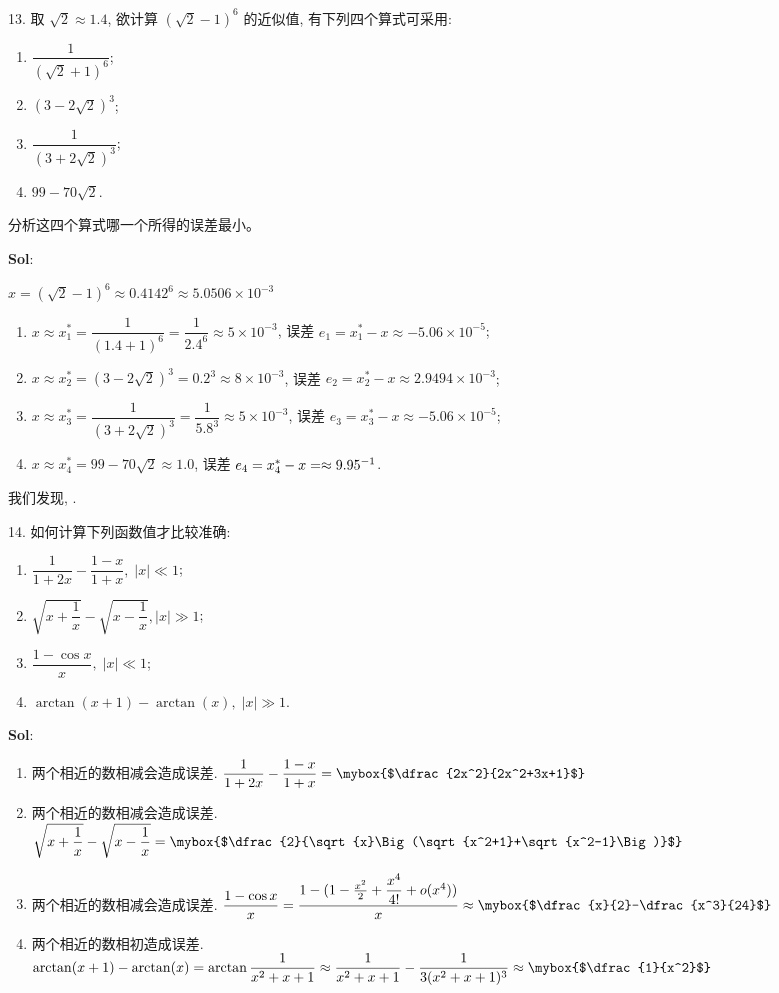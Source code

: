 
13. 取 $\sqrt{2}\approx  1.4$, 欲计算 $(\sqrt{2}-1)^6$ 的近似值, 有下列四个算式可采用:
\begin{enumerate}[(1)]
    \item $\dfrac{1}{(\sqrt{2}+1)^6}$;
    \item $(3-2\sqrt{2})^3$;
    \item $\dfrac{1}{(3+2\sqrt{2})^3}$;
    \item $99-70\sqrt{2}$.
\end{enumerate}
分析这四个算式哪一个所得的误差最小。

\textbf{Sol}:

$x=(\sqrt{2}-1)^6\approx 0.4142^6\approx5.0506\times 10^{-3}$
\begin{enumerate}
    \item $x\approx x_1^*=\dfrac{1}{(1.4+1)^6}=\dfrac{1}{2.4^6}\approx5\times 10^{-3}$, 误差 $e_1=x_1^*-x\approx -5.06\times 10^{-5}$;
    \item $x\approx x_2^*=(3-2\sqrt{2})^3=0.2^3\approx8\times10^{-3}$, 误差 $e_2=x_2^*-x\approx 2.9494\times 10^{-3}$;
    \item $x\approx x_3^*=\dfrac{1}{(3+2\sqrt{2})^3}=\dfrac{1}{5.8^3}\approx 5\times 10^{-3}$, 误差 $e_3=x_3^*-x\approx -5.06\times10^{-5}$;
    \item $x\approx x_4^*=99-70\sqrt{2}\approx 1.0$, 误差 $e_4=x_4^*-x=\approx 9.95\time 10^{-1}$.
\end{enumerate}
我们发现, .

\vspace{12pt}

14. 如何计算下列函数值才比较准确:
\begin{enumerate}
    \item $\dfrac{1}{1+2x}-\dfrac{1-x}{1+x},\;|x|\ll 1$;
    \item $\sqrt{x+\dfrac{1}{x}}-\sqrt{x-\dfrac{1}{x}},|x|\gg 1$;
    \item $\dfrac{1-\cos x}{x},\;|x|\ll 1$;
    \item $\arctan(x+1)-\arctan (x),\;|x|\gg 1$.
\end{enumerate}

\textbf{Sol}:
\begin{enumerate}
    \item 两个相近的数相减会造成误差. $\dfrac{1}{1+2x}-\dfrac{1-x}{1+x}=\mybox{$\dfrac{2x^2}{2x^2+3x+1}$}$
    \item 两个相近的数相减会造成误差. $\sqrt{x+\dfrac{1}{x}}-\sqrt{x-\dfrac{1}{x}}=\mybox{$\dfrac{2}{\sqrt{x}\Big(\sqrt{x^2+1}+\sqrt{x^2-1}\Big)}$}$
    \item 两个相近的数相减会造成误差. $\dfrac{1-\cos x}{x}=\dfrac{1-(1-\frac{x^2}{2}+\dfrac{x^4}{4!}+o(x^4))}{x}\approx\mybox{$\dfrac{x}{2}-\dfrac{x^3}{24}$}$
    \item 两个相近的数相初造成误差. $\arctan(x+1)-\arctan(x)=\arctan\dfrac{1}{x^2+x+1}\approx\dfrac{1}{x^2+x+1}-\dfrac{1}{3(x^2+x+1)^3}\approx\mybox{$\dfrac{1}{x^2}$}$
\end{enumerate}


